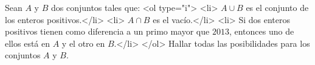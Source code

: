 Sean $A$ y $B$ dos conjuntos tales que:
<ol type="i">
  <li> $A \cup B$ es el conjunto de los enteros positivos.</li>
  <li> $A \cap B$ es el vacío.</li>
  <li> Si dos enteros positivos tienen como diferencia a un primo mayor que $2013$, entonces uno de ellos está en $A$ y el otro en $B$.</li>
</ol>
Hallar todas las posibilidades para los conjuntos $A$ y $B$.
